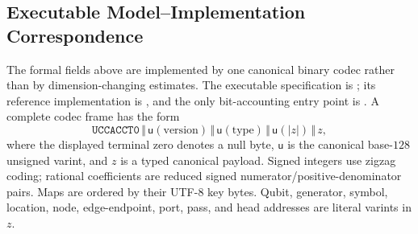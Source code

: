 \subsection{Executable Model--Implementation Correspondence}
\label{sec:model-implementation-mapping}

The formal fields above are implemented by one canonical binary codec rather
than by dimension-changing estimates.  The executable specification is
; its reference implementation is
, and the only bit-accounting entry point is
.  A complete codec frame has
the form
\begin{equation}
 \mathtt{UCCACCT0}\,\Vert\,
 \mathsf u(\text{version})\,\Vert\,
 \mathsf u(\text{type})\,\Vert\,
 \mathsf u(|z|)\,\Vert\,z,
 \label{eq:executable-codec-frame}
\end{equation}
where the displayed terminal zero denotes a null byte, $\mathsf u$ is the
canonical base-$128$ unsigned varint, and $z$ is a typed canonical payload.
Signed integers use zigzag coding; rational coefficients are reduced signed
numerator/positive-denominator pairs.  Maps are ordered by their UTF-8 key
bytes.  Qubit, generator, symbol, location, node, edge-endpoint, port, pass,
and head addresses are literal varints in $z$.

